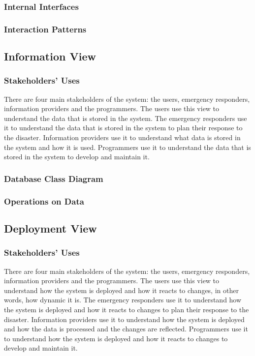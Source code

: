 \documentclass[a4paper]{article}
\begin{document}
    \subsubsection{Internal Interfaces}
    \lipsum[1-1] %
    \subsubsection{Interaction Patterns}
    \lipsum[1-1] %
    \subsection{Information View}
    \subsubsection{Stakeholders' Uses}
    There are four main stakeholders of the system: the users, emergency responders, information providers and the programmers.
    The users use this view to understand the data that is stored in the system. The emergency responders use it to understand
    the data that is stored in the system to plan their response to the disaster. Information providers use it to understand
    what data is stored in the system and how it is used. Programmers use it to understand the data that is stored in the system
    to develop and maintain it.
    \subsubsection{Database Class Diagram}
    \subsubsection{Operations on Data}
    \lipsum[1-1] %
    \subsection{Deployment View}
    \subsubsection{Stakeholders' Uses}
    There are four main stakeholders of the system: the users, emergency responders, information providers and the programmers.
    The users use this view to understand how the system is deployed and how it reacts to changes, in other words, how dynamic it is.
    The emergency responders use it to understand how the system is deployed and how it reacts to changes to plan their response
    to the disaster. Information providers use it to understand how the system is deployed and how the data is processed and the
    changes are reflected. Programmers use it to understand how the system is deployed and how it reacts to changes to develop
    and maintain it.
\end{document}
